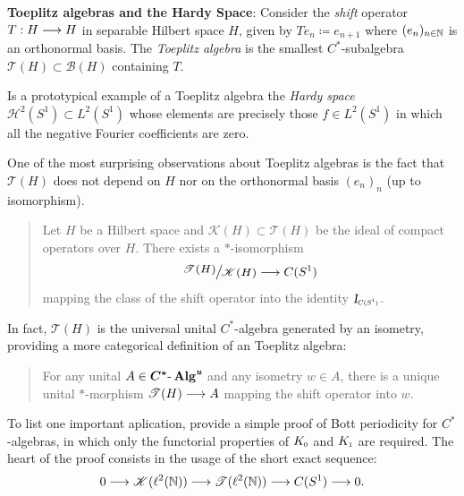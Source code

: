 \begin{exemplos}
\begin{itroman}
    \item \textbf{Toeplitz algebras and the Hardy Space}: Consider the \textit{shift} operator $T: H\longrightarrow H$ in separable Hilbert space $H$, given by $Te_n \coloneqq e_{n+1}$  where $(e_n)_{n\in \operatorname{\mathbb{N}}}$ is an orthonormal basis. The \textit{Toeplitz algebra} is the smallest $C^*$-subalgebra $\mathscr T(H) \subset \mathscr B(H)$ containing $T$. 
    
    Is a prototypical example of a Toeplitz algebra the \textit{Hardy space} $\mathscr H^2(S^1) \subset L^2(S^1)$ whose elements are precisely those $f\in L^2(S^1)$ in which all the negative Fourier coefficients are zero. 
    
    One of the most surprising observations about Toeplitz algebras is the fact that $\mathscr T(H)$ does not depend on $H$ nor on the orthonormal basis $(e_n)_n$ (up to isomorphism). 
    \begin{quote}       \begin{invocacao}
        Let $H$ be a Hilbert space and $\mathscr K(H) \subset \mathscr T(H)$ be the ideal of compact operators over $H$. There exists a $*$-isomorphism  
        \begin{equation*}
            \mfrac{\mathscr T(H)}{\mathscr K(H)} \longto C(S^1)
        \end{equation*}
        mapping the class of the shift operator into the identity $\sub{\Id}{C(S^1)}$.
    \end{invocacao}
    \end{quote}
    In fact, $\mathscr T(H)$ is the universal unital $C^*$-algebra generated by an isometry, providing a more categorical definition of an Toeplitz algebra: 
    \begin{quote}
        \begin{invocacao}[Coburn]
            For any unital $A \in \boldsymbol{C^*\text{-}\operatorname{Alg}}^{\textit{\textbf{u}}}$ and any isometry $w \in A$, there is a unique unital $*$-morphism $\mathscr T(H) \longrightarrow A$ mapping the shift operator into $w$.
        \end{invocacao}
    \end{quote}
    To list one important aplication, \cite{cuntz1984k} provide a simple proof of Bott periodicity for $C^*$-algebras, in which only the functorial properties of $\sub K0$ and $\sub K1$ are required. The heart of the proof consists in the usage of the short exact sequence:
    $$0 \longrightarrow \mathscr K(\ell^2(\operatorname{\mathbb{N}}))\longrightarrow \mathscr T(\ell^2(\operatorname{\mathbb{N}})) \longrightarrow C(S^1) \longrightarrow 0.$$
\end{itroman}
\end{exemplos}

